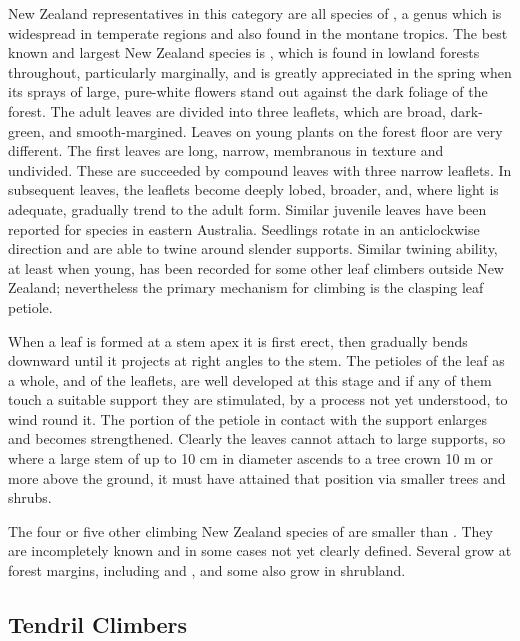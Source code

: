 New Zealand representatives in this category are all species of , a genus which is widespread in temperate regions and also found in the montane tropics.
The best known and largest New Zealand species is , which is found in lowland forests throughout, particularly marginally, and is greatly appreciated in the spring when its sprays of large, pure-white flowers stand out against the dark foliage of the forest.
The adult leaves are divided into three leaflets, which are broad, dark-green, and smooth-margined.
Leaves on young plants on the forest floor are very different.
The first leaves are long, narrow, membranous in texture and undivided.
These are succeeded by compound leaves with three narrow leaflets.
In subsequent leaves, the leaflets become deeply lobed, broader, and, where light is adequate, gradually trend to the adult form.
Similar juvenile leaves have been reported for  species in eastern Australia.
Seedlings rotate in an anticlockwise direction and are able to twine around slender supports.
Similar twining ability, at least when young, has been recorded for some other leaf climbers outside New Zealand; nevertheless the primary mechanism for climbing is the clasping leaf petiole.

When a leaf is formed at a stem apex it is first erect, then gradually bends downward until it projects at right angles to the stem.
The petioles of the leaf as a whole, and of the leaflets, are well developed at this stage and if any of them touch a suitable support they are stimulated, by a process not yet understood, to wind round it.
The portion of the petiole in contact with the support enlarges and becomes strengthened.
Clearly the leaves cannot attach to large supports, so where a large stem of  up to 10 cm in diameter ascends to a tree crown 10 m or more above the ground, it must have attained that position via smaller trees and shrubs.

The four or five other climbing New Zealand species of  are smaller than .
They are incompletely known and in some cases not yet clearly defined.
Several grow at forest margins, including  and , and some also grow in shrubland.

\subsection{Tendril Climbers}

